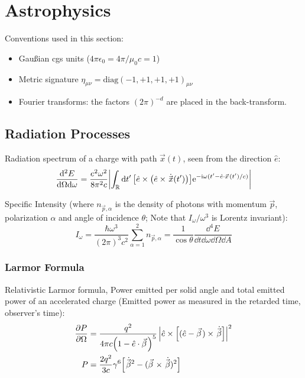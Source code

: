 \section{Astrophysics}
	Conventions used in this section:
	\begin{itemize}
		\item Gaußian cgs units ($4\pi\epsilon_0 = 4 \pi / \mu_0 c = 1$)
		\item Metric signature $\eta_{\mu\nu}=\mathrm{diag}(-1,+1,+1,+1)_{\mu\nu}$
		\item Fourier transforms: the factors $(2\pi)^{-d}$ are placed in the back-transform.
	\end{itemize}

	\subsection{Radiation Processes}
		Radiation spectrum of a charge with path $\vec{x}(t)$, seen from the direction $\hat{e}$:
		\begin{equation}
			\frac{\dd^2 E}{\dd \Omega \dd \omega} = \frac{e^2 \omega^2}{8 \pi^2 c} \abs{\int_{\mathbb{R}}\dd{t'} \qty[\hat{e}\times \qty(\hat{e}\times \dot{\vec{x}}(t'))] \ex^{-\i \omega (t'-\hat{e}\cdot \vec{x}(t')/c)}}
		\end{equation}

		\noindent
		Specific Intensity (where $n_{\vec{p},\alpha}$ is the density of photons with momentum $\vec{p}$, polarization $\alpha$ and angle of incidence $\theta$; Note that $I_\omega / \omega^3$ is Lorentz invariant):
		\begin{equation}
			I_\omega = \frac{\hbar \omega^3}{(2 \pi)^3 c^2} \sum_{\alpha=1}^{2} n_{\vec{p},\alpha} = \frac{1}{\cos \theta} \frac{\dd^4 E}{\dd t \dd\omega \dd \Omega \dd A}
		\end{equation}

		\subsubsection{Larmor Formula}
			Relativistic Larmor formula,
			Power emitted per solid angle and total emitted power of an accelerated charge (Emitted power as measured in the retarded time, \ie observer's time):
			\begin{equation}
				\label{eq:LarmorFormula}
				\begin{aligned}
					\pdv{P}{\Omega} &= \frac{q^2}{4\pi c\qty(1-\hat{e}\cdot\vec{\beta})^5} \left| \hat{e}\times\qty[(\hat{e}-\vec{\beta}) \times \dot{\vec{\beta}}] \right|^2 \\
					P &= \frac{2q^2}{3c}\gamma^6\qty[\dot{\vec{\beta}}^2 - (\vec{\beta}\times\dot{\vec{\beta}})^2] \\
				\end{aligned}
			\end{equation}

